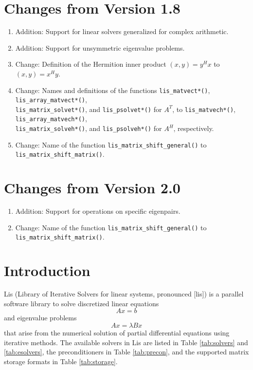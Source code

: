 \documentclass[a4paper]{article}
\begin{document}
\section*{Changes from Version 1.8}
\begin{enumerate}
\item Addition: Support for linear solvers generalized for complex arithmetic.
\item Addition: Support for unsymmetric eigenvalue problems.
\item Change: Definition of the Hermition inner product $(x,y)=y^{H}x$ to $(x,y)=x^{H}y$.
\item Change: Names and definitions of the functions 
      {\tt lis\_matvect*()},
      {\tt lis\_array\_matvect*()}, \\
      {\tt lis\_matrix\_solvet*()}, and 
      {\tt lis\_psolvet*()} for $A^T$, to 
      {\tt lis\_matvech*()}, 
      {\tt lis\_array\_matvech*()}, \\
      {\tt lis\_matrix\_solveh*()}, and 
      {\tt lis\_psolveh*()} for $A^H$, respectively.
\item Change: Name of the function {\tt lis\_matrix\_shift\_general()} to
{\tt lis\_matrix\_shift\_matrix()}. 
\end{enumerate}

\section*{Changes from Version 2.0}
\begin{enumerate}
\item Addition: Support for operations on specific eigenpairs.
\item Change: Name of the function {\tt lis\_matrix\_shift\_general()} to {\tt lis\_matrix\_shift\_matrix()}.
\end{enumerate}

\newpage
\section{Introduction}
Lis (Library of Iterative Solvers for linear systems, pronounced [lis]) 
is a parallel software library to solve discretized linear equations
\[
 Ax = b
\]
and eigenvalue problems
\[
 Ax = \lambda Bx
\]
that arise from the numerical solution of
partial differential equations using iterative methods\cite{nishida}.
The available solvers in Lis are listed in Table \ref{tab:solvers} and
\ref{tab:esolvers}, the preconditioners in Table \ref{tab:precon}, and
the supported matrix storage formats in Table \ref{tab:storage}.
\end{document}
